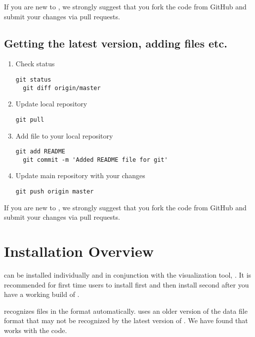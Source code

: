 \documentclass[11pt,fleqn]{book} %
\begin{document}
\begin{WarningBox}
If you are new to \Vaango, we strongly suggest that you fork the code from GitHub and submit 
your changes via pull requests.
\end{WarningBox}

\subsection{Getting the latest version, adding files etc.}
\begin{enumerate}
  \item Check status
\begin{lstlisting}[backgroundcolor=\color{background}]
  git status
  git diff origin/master
\end{lstlisting}

  \item Update local repository
\begin{lstlisting}[backgroundcolor=\color{background}]
  git pull
\end{lstlisting}

  \item Add file to your local repository
\begin{lstlisting}[backgroundcolor=\color{background}]
  git add README
  git commit -m 'Added README file for git'
\end{lstlisting}

  \item Update main repository with your changes
\begin{lstlisting}[backgroundcolor=\color{background}]
  git push origin master
\end{lstlisting}
\end{enumerate}

\begin{WarningBox}
If you are new to \Vaango, we strongly suggest that you fork the code from GitHub and submit 
your changes via pull requests.
\end{WarningBox}

\section{Installation Overview}
\Vaango can be installed individually and in conjunction with
the visualization tool, \Visit.  It is recommended for
first time users to install \Vaango first and then install
\Visit second after you  have a working build of
\Vaango.  

\begin{WarningBox}
\Visit recognizes files in the \Uintah format automatically.  \Vaango
uses an older version of the \Uintah data file format that may not 
be recognized by the latest version of \Visit.  We have found that
 works with the \Vaango code.
\end{WarningBox}
\end{document}
